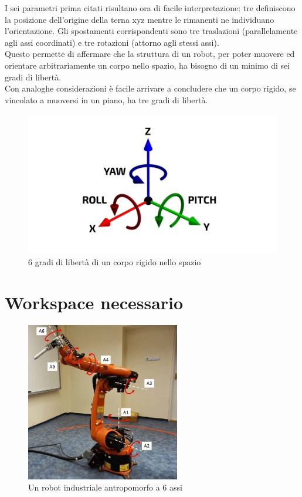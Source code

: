 \documentclass[%
corpo=11pt,
twoside,
 stile=classica,
oldstyle,
greek,%
]{toptesi}
\begin{document}
	 I sei parametri prima citati risultano ora di facile interpretazione: tre definiscono la posizione dell'origine della terna xyz mentre le rimanenti ne individuano l'orientazione. Gli spostamenti corrispondenti sono tre traslazioni (parallelamente agli assi coordinati) e tre rotazioni (attorno agli stessi assi).\\
	  Questo permette di affermare che la struttura di un robot, per poter muovere ed orientare arbitrariamente un corpo nello spazio, ha bisogno di un minimo di sei gradi di libertà. \\
	  Con analoghe considerazioni è facile arrivare a concludere che un corpo rigido, se vincolato a muoversi in un piano, ha tre gradi di libertà. 
	 
	 \begin{figure}
	 	\centering
	 	\includegraphics[width=\textwidth]{pictures/6DOF.png}
	 	\caption{6 gradi di libertà di un corpo rigido nello spazio}
	 	\label{fig:6DOF}
	 \end{figure}

\section{Workspace necessario}

\begin{figure}
	\centering
	\includegraphics[width=0.6\textwidth]{pictures/KUKA.png}
	\caption{Un robot industriale antropomorfo a 6 assi}
	\label{fig:KUKA}
\end{figure}
\end{document}
